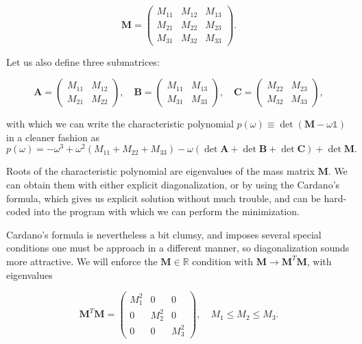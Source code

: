 \documentclass[12pt, a4paper]{article}
\renewcommand{\ni}{
	\noindent
}
\newcommand{\M}{
	\ensuremath{\mathbf{M}}
}
\newcommand{\I}{
	\ensuremath{\mathds{1}}
}
\newcommand{\A}{
	\ensuremath{\mathbf{A}}
}
\newcommand{\B}{
	\ensuremath{\mathbf{B}}
}
\newcommand{\C}{
	\ensuremath{\mathbf{C}}
}
\newcommand{\w}{
	\ensuremath{\omega}
}
\begin{document}
\begin{equation}
	\M = \begin{pmatrix}
		M_{11} & M_{12} & M_{13} \\
		M_{21} & M_{22} & M_{23} \\
		M_{31} & M_{32} & M_{33}
	\end{pmatrix}.
\end{equation}

\ni Let us also define three submatrices:

\begin{equation}
	\A = \begin{pmatrix}
		M_{11} & M_{12} \\
		M_{21} & M_{22}
	\end{pmatrix}, \quad
	\B = \begin{pmatrix}
		M_{11} & M_{13} \\
		M_{31} & M_{33}
	\end{pmatrix}, \quad
	\C = \begin{pmatrix}
		M_{22} & M_{23} \\
		M_{32} & M_{33}
	\end{pmatrix},
\end{equation}

\ni with which we can write the characteristic polynomial $p(\w) \equiv \det(\M - \omega\I)$ in a cleaner fashion as
\begin{equation}
	p(\w) = -\w^3 + \w^2 (M_{11} + M_{22} + M_{33}) - \w(\det\A + \det\B + \det\C) + \det\M.
\end{equation}

\ni Roots of the characteristic polynomial are eigenvalues of the mass matrix $\M$. We can obtain them with either
explicit diagonalization, or by using the Cardano's formula, which gives us explicit solution without much trouble, and
can be hard-coded into the program with which we can perform the minimization.

Cardano's formula is nevertheless a bit clumsy, and imposes several special conditions one must be approach in
a different manner, so diagonalization sounds more attractive. We will enforce the $\M \in \mathbb{R}$ condition
with $\M \to \M^T \M$, with eigenvalues

\[
	\M^T \M = \begin{pmatrix}
		M_{1}^2 & 0 & 0\\
		0 & M_{2}^2 & 0\\
		0 & 0 & M_{3}^2
	\end{pmatrix}, \quad M_1 \leq M_2 \leq M_3.
\]
\end{document}
